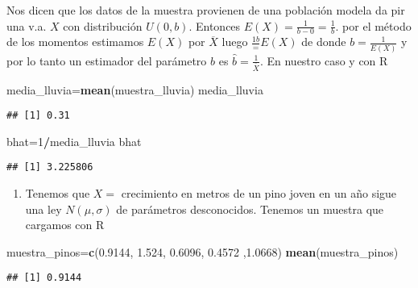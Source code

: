 \documentclass[]{article}
\newenvironment{Shaded}{\begin{snugshade}}{\end{snugshade}}
\newcommand{\DecValTok}[1]{\textcolor[rgb]{0.00,0.00,0.81}{#1}}
\newcommand{\FloatTok}[1]{\textcolor[rgb]{0.00,0.00,0.81}{#1}}
\newcommand{\KeywordTok}[1]{\textcolor[rgb]{0.13,0.29,0.53}{\textbf{#1}}}
\newcommand{\NormalTok}[1]{#1}
\newcommand{\OperatorTok}[1]{\textcolor[rgb]{0.81,0.36,0.00}{\textbf{#1}}}
\providecommand{\tightlist}{%
  \setlength{\itemsep}{0pt}\setlength{\parskip}{0pt}}
\begin{document}
Nos dicen que los datos de la muestra provienen de una población modela
da pir una v.a. \(X\) con distribución \(U(0,b)\). Entonces
\(E(X)=\frac{1}{b-0}=\frac1b.\) por el método de los momentos estimamos
\(E(X)\) por \(\overline{X}\) luego \(\frac{1b}=E(X)\) de donde
\(b=\frac{1}{E(X)}\) y por lo tanto un estimador del parámetro \(b\) es
\(\hat{b}=\frac{1}{\overline{X}}.\) En nuestro caso y con R

\begin{Shaded}
\begin{Highlighting}[]
\NormalTok{media_lluvia=}\KeywordTok{mean}\NormalTok{(muestra_lluvia)}
\NormalTok{media_lluvia}
\end{Highlighting}
\end{Shaded}

\begin{verbatim}
## [1] 0.31
\end{verbatim}

\begin{Shaded}
\begin{Highlighting}[]
\NormalTok{bhat=}\DecValTok{1}\OperatorTok{/}\NormalTok{media_lluvia}
\NormalTok{bhat}
\end{Highlighting}
\end{Shaded}

\begin{verbatim}
## [1] 3.225806
\end{verbatim}

\begin{enumerate}
\def\labelenumi{\arabic{enumi}.}
\setcounter{enumi}{1}
\tightlist
\item
  Tenemos que \(X=\) crecimiento en metros de un pino joven en un año
  sigue una ley \(N(\mu,\sigma)\) de parámetros desconocidos. Tenemos un
  muestra que cargamos con R
\end{enumerate}

\begin{Shaded}
\begin{Highlighting}[]
\NormalTok{muestra_pinos=}\KeywordTok{c}\NormalTok{(}\FloatTok{0.9144}\NormalTok{, }\FloatTok{1.524}\NormalTok{, }\FloatTok{0.6096}\NormalTok{, }\FloatTok{0.4572}\NormalTok{ ,}\FloatTok{1.0668}\NormalTok{)}
\KeywordTok{mean}\NormalTok{(muestra_pinos)}
\end{Highlighting}
\end{Shaded}

\begin{verbatim}
## [1] 0.9144
\end{verbatim}
\end{document}
